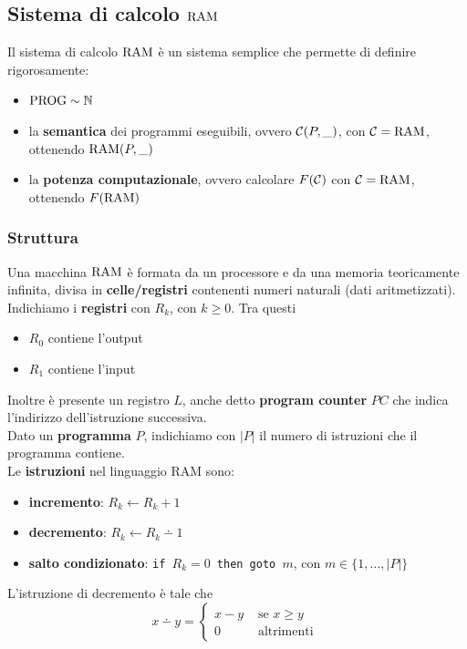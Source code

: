 \subsection{Sistema di calcolo $\text{RAM}$}
Il sistema di calcolo $\text{RAM}$ è un sistema semplice che permette di definire rigorosamente: 
\begin{itemize}
	\item $\text{PROG} \sim \mathbb{N}$
	\item la \textbf{semantica} dei programmi eseguibili, ovvero $\mathcal{C}(P,\_)$, con $\mathcal{C} = \text{RAM}$, ottenendo $\text{RAM} (P,\_)$
	\item la \textbf{potenza computazionale}, ovvero calcolare $F(\mathcal{C})$ con $\mathcal{C} = \text{RAM}$, ottenendo $F(\text{RAM})$
\end{itemize}

\subsubsection{Struttura}
Una macchina $\text{RAM}$ è formata da un processore e da una memoria teoricamente infinita, divisa in \textbf{celle/registri} contenenti numeri naturali (dati aritmetizzati).\\

Indichiamo i \textbf{registri} con $R_k$, con $k \geq 0$. Tra questi 
\begin{itemize}
	\item $R_0$ contiene l'output
	\item $R_1$ contiene l'input
\end{itemize}

Inoltre è presente un registro $L$, anche detto \textbf{program counter} $PC$ che indica l'indirizzo dell'istruzione successiva.\\

Dato un \textbf{programma} $P$, indichiamo con $|P|$ il numero di istruzioni che il programma contiene.\\

Le \textbf{istruzioni} nel linguaggio RAM sono: 
\begin{itemize}
	\item \textbf{incremento}: $R_k \leftarrow R_k + 1$
	\item \textbf{decremento}: $R_k \leftarrow R_k \dotminus 1$
	\item \textbf{salto condizionato}: \texttt{if $R_k = 0$ then goto $m$}, con $m \in \{1, \dots, |P|\}$
\end{itemize}
L'istruzione di decremento è tale che
$$ x \dotminus y = \begin{cases}
	x-y & \text{ se } x \geq y\\
	0 & \text{ altrimenti }
\end{cases}$$

